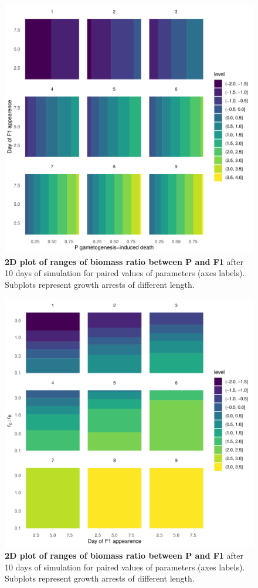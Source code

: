 \documentclass[a4paper,oneside]{book}
\begin{document}
    \begin{figure}
      \includegraphics[width=\linewidth]{imgs/b.pdf}
      \caption{\textbf{2D plot of ranges of biomass ratio between P and F1} after 10 days of simulation for paired values of parameters (axes labels). Subplots represent growth arrests of different length.}\label{gon2}
    \end{figure}

    \begin{figure}
      \includegraphics[width=\linewidth]{imgs/c.pdf}
      \caption{\textbf{2D plot of ranges of biomass ratio between P and F1} after 10 days of simulation for paired values of parameters (axes labels). Subplots represent growth arrests of different length.}\label{gon3}
    \end{figure}
\end{document}
